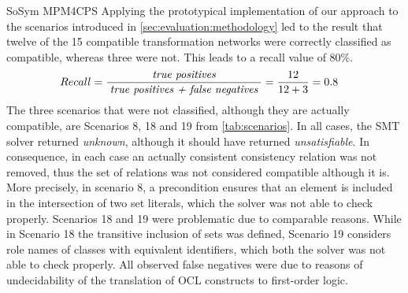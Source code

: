 \begin{copiedFrom}{SoSym MPM4CPS}
Applying the prototypical implementation of our approach to the scenarios introduced in \autoref{sec:evaluation:methodology} led to the result that twelve of the 15 compatible transformation networks were correctly classified as compatible, whereas three were not.
This leads to a recall value of 80\%.
\begin{align*}
    &
    Recall = \frac{\; \textit{true positives} \;}{\; \textit{true positives + false negatives} \;} = \frac{12}{12+3} = 0.8
\end{align*}
%
%
The three scenarios that were not classified, although they are actually compatible, are Scenarios 8, 18 and 19 from \autoref{tab:scenarios}.
In all cases, the SMT solver returned \emph{unknown}, although it should have returned \emph{unsatisfiable}.
In consequence, in each case an actually consistent consistency relation was not removed, thus the set of relations was not considered compatible although it is.
More precisely, in scenario 8, a precondition ensures that an element is included in the intersection of two set literals, which the solver was not able to check properly.
Scenarios 18 and 19 were problematic due to comparable reasons.
While in Scenario 18 the transitive inclusion of sets was defined, Scenario 19 considers role names of classes with equivalent identifiers, which both the solver was not able to check properly.
All observed false negatives were due to reasons of undecidability of the translation of OCL constructs to first-order logic.


\end{copiedFrom}

